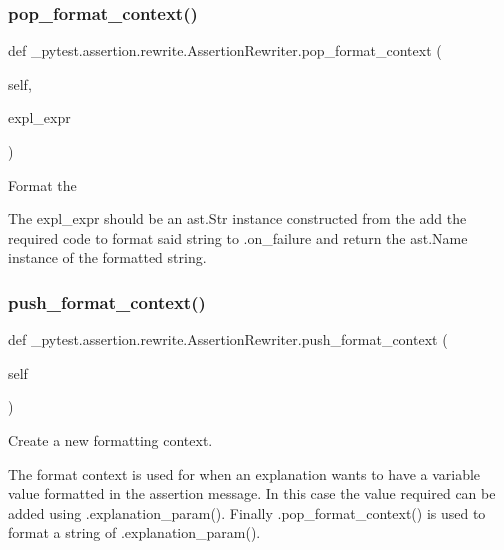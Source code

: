 \subsubsection{\texorpdfstring{pop\+\_\+format\+\_\+context()}{pop\_format\_context()}}
{\footnotesize\ttfamily def \+\_\+pytest.\+assertion.\+rewrite.\+Assertion\+Rewriter.\+pop\+\_\+format\+\_\+context (\begin{DoxyParamCaption}\item[{}]{self,  }\item[{}]{expl\+\_\+expr }\end{DoxyParamCaption})}

\begin{DoxyVerb}Format the %

The expl_expr should be an ast.Str instance constructed from
the %
add the required code to format said string to .on_failure and
return the ast.Name instance of the formatted string.\end{DoxyVerb}
 \mbox{\label{class__pytest_1_1assertion_1_1rewrite_1_1_assertion_rewriter_a590937da24b0c7344679f33cad4ac77f}} 
\subsubsection{\texorpdfstring{push\+\_\+format\+\_\+context()}{push\_format\_context()}}
{\footnotesize\ttfamily def \+\_\+pytest.\+assertion.\+rewrite.\+Assertion\+Rewriter.\+push\+\_\+format\+\_\+context (\begin{DoxyParamCaption}\item[{}]{self }\end{DoxyParamCaption})}

\begin{DoxyVerb}Create a new formatting context.

The format context is used for when an explanation wants to
have a variable value formatted in the assertion message.  In
this case the value required can be added using
.explanation_param().  Finally .pop_format_context() is used
to format a string of %
.explanation_param().\end{DoxyVerb}
 \mbox{\label{class__pytest_1_1assertion_1_1rewrite_1_1_assertion_rewriter_ae3af02a0f2a2a4dc3812d0c9736b0958}} 
